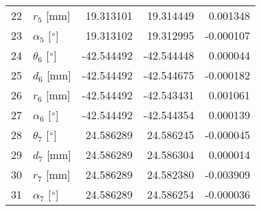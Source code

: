 \documentclass{standalone}%
\begin{document}
\begin{tabular}{llrrr}
22 &              $r_{5}$ [mm] &  19.313101 &  19.314449 &   0.001348 \\
23 &  $\alpha_{5}$ [$\degree$] &  19.313102 &  19.312995 &  -0.000107 \\
24 &  $\theta_{6}$ [$\degree$] & -42.544492 & -42.544448 &   0.000044 \\
25 &              $d_{6}$ [mm] & -42.544492 & -42.544675 &  -0.000182 \\
26 &              $r_{6}$ [mm] & -42.544492 & -42.543431 &   0.001061 \\
27 &  $\alpha_{6}$ [$\degree$] & -42.544492 & -42.544354 &   0.000139 \\
28 &  $\theta_{7}$ [$\degree$] &  24.586289 &  24.586245 &  -0.000045 \\
29 &              $d_{7}$ [mm] &  24.586289 &  24.586304 &   0.000014 \\
30 &              $r_{7}$ [mm] &  24.586289 &  24.582380 &  -0.003909 \\
31 &  $\alpha_{7}$ [$\degree$] &  24.586289 &  24.586254 &  -0.000036 \\
\bottomrule
\end{tabular}
%
\end{document}
